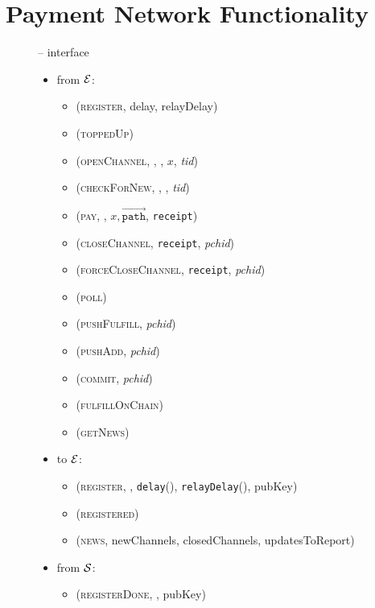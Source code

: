\section{Payment Network Functionality}
  \label{appendix:payfunc}
  \begin{figure}[H]
    \begin{systembox}{\fpaynet{} -- interface}
      \begin{itemize}
        \item from $\mathcal{E}$:
        \begin{itemize}
          \item (\textsc{register}, delay, relayDelay)
          \item (\textsc{toppedUp})
          \item (\textsc{openChannel}, \alice, \bob, $x$, \textit{tid})
          \item (\textsc{checkForNew}, \alice, \bob, \textit{tid})
          \item (\textsc{pay}, \bob, $x, \overrightarrow{\mathtt{path}}$,
          \texttt{receipt})
          \item (\textsc{closeChannel}, \texttt{receipt}, \textit{pchid})
          \item (\textsc{forceCloseChannel}, \texttt{receipt}, \textit{pchid})
          \item (\textsc{poll})
          \item (\textsc{pushFulfill}, \textit{pchid})
          \item (\textsc{pushAdd}, \textit{pchid})
          \item (\textsc{commit}, \textit{pchid})
          \item (\textsc{fulfillOnChain})
          \item (\textsc{getNews})
        \end{itemize}
        \item to $\mathcal{E}$:
        \begin{itemize}
          \item (\textsc{register}, \alice, \texttt{delay}(\alice),
          \texttt{relayDelay}(\alice), pubKey)
          \item (\textsc{registered})
          \item (\textsc{news}, newChannels, closedChannels, updatesToReport)
        \end{itemize}
        \item from $\mathcal{S}$:
        \begin{itemize}
          \item (\textsc{registerDone}, \alice, pubKey)

\end{itemize}
\end{itemize}
\end{systembox}
\end{figure}
